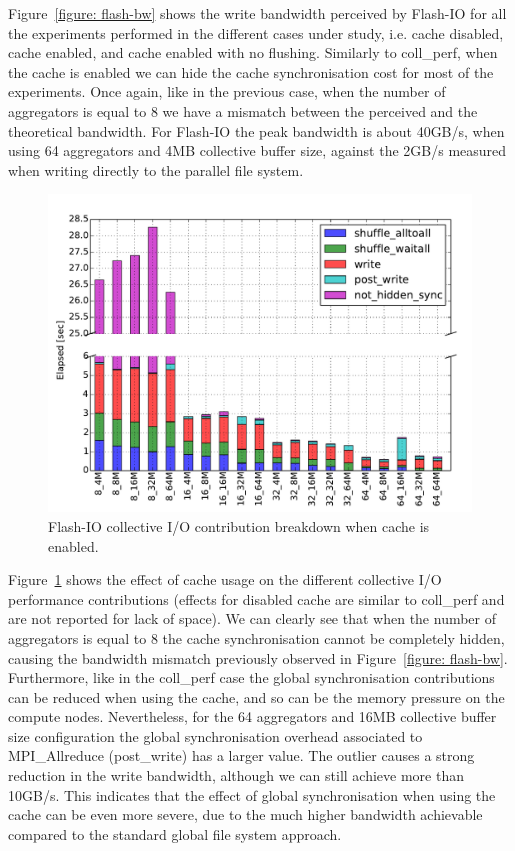 Figure~\ref{figure: flash-bw} shows the write bandwidth perceived by Flash-IO for all the experiments performed in the different cases under study, i.e. cache disabled, cache enabled, and cache enabled with no flushing. Similarly to coll\_perf, when the cache is enabled we can hide the cache synchronisation cost for most of the experiments. Once again, like in the previous case, when the number of aggregators is equal to 8 we have a mismatch between the perceived and the theoretical bandwidth. For Flash-IO the peak bandwidth is about 40GB/s, when using 64 aggregators and 4MB collective buffer size, against the 2GB/s measured when writing directly to the parallel file system.
\begin{figure}[htb]
  \centering
  \includegraphics[width=0.9\columnwidth]{figures/flash_32GB_30sec_elapsed_enable}
  \caption{Flash-IO collective I/O contribution breakdown when cache is enabled.}
  \label{figure: flash-elaps-enable}
\end{figure}

Figure~\ref{figure: flash-elaps-enable} shows the effect of cache usage on the different collective I/O performance contributions (effects for disabled cache are similar to coll\_perf and are not reported for lack of space). We can clearly see that when the number of aggregators is equal to 8 the cache synchronisation cannot be completely hidden, causing the bandwidth mismatch previously observed in Figure~\ref{figure: flash-bw}. Furthermore, like in the coll\_perf case the global synchronisation contributions can be reduced when using the cache, and so can be the memory pressure on the compute nodes.
Nevertheless, for the 64 aggregators and 16MB collective buffer size configuration the global synchronisation overhead associated to MPI\_Allreduce (post\_write) has a larger value. The outlier causes a strong reduction in the write bandwidth, although we can still achieve more than 10GB/s. This indicates that the effect of global synchronisation when using the cache can be even more severe, due to the much higher bandwidth achievable compared to the standard global file system approach.

